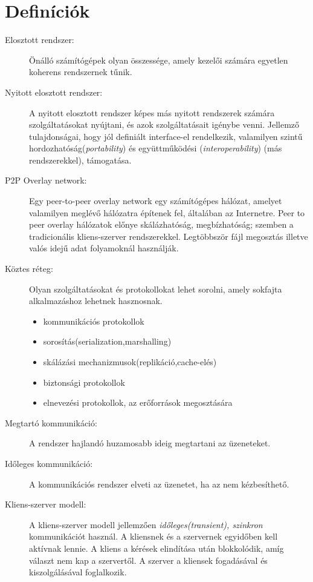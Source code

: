 \documentclass[12pt]{article}
\begin{document}
\section{Definíciók}
\begin{description}
    \item[Elosztott rendszer:] Önálló számítógépek olyan összessége, amely kezelői számára egyetlen koherens rendszernek tűnik.
    \item[Nyitott elosztott rendszer:] A nyitott elosztott rendszer képes más nyitott rendszerek számára szolgáltatásokat nyújtani, és azok szolgáltatásait igénybe venni.  Jellemző tulajdonságai, hogy jól definiált interface-el rendelkezik, valamilyen szintű hordozhatóság(\textit{portability}) és együttműködési (\textit{interoperability}) (más rendszerekkel), támogatása. 
    \item [P2P Overlay network:] Egy peer-to-peer overlay network egy számítógépes hálózat, amelyet valamilyen meglévő hálózatra építenek fel, általában az Internetre. Peer to peer overlay hálózatok előnye skálázhatóság, megbízhatóság; szemben a tradicionális kliens-szerver rendszerekkel. Legtöbbször fájl megosztás illetve valós idejű adat folyamoknál használják.
    \item [Köztes réteg:] Olyan szolgáltatásokat és protokollokat lehet sorolni, amely sokfajta alkalmazáshoz lehetnek hasznosnak.
        \begin{itemize}
            \item kommunikációs protokollok
            \item sorosítás(serialization,marshalling)
            \item skálázási mechanizmusok(replikáció,cache-elés)
            \item biztonsági protokollok
            \item elnevezési protokollok, az erőforrások megosztására
        \end{itemize}
    \item[Megtartó kommunikáció:] A rendszer hajlandó huzamosabb ideig megtartani az üzeneteket.
    \item[Időleges kommunikáció:] A kommunikációs rendszer elveti az üzenetet, ha az nem kézbesíthető.
    \item[Kliens-szerver modell:] A kliens-szerver modell jellemzően \textit{időleges(transient), szinkron} kommunikációt használ. A kliensnek és a szervernek egyidőben kell aktívnak lennie. A kliens a kérések elindítása után blokkolódik, amíg választ nem kap a szervertől. A szerver a kliensek fogadásával és kiszolgálásával foglalkozik.

\end{description}
\end{document}
